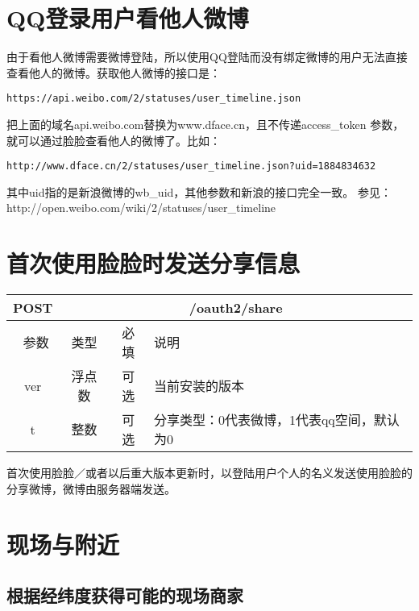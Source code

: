 \documentclass[cs4size]{ctexartutf8}
\begin{document}




\section{QQ登录用户看他人微博}
由于看他人微博需要微博登陆，所以使用QQ登陆而没有绑定微博的用户无法直接查看他人的微博。获取他人微博的接口是：
\begin{verbatim}
https://api.weibo.com/2/statuses/user_timeline.json
\end{verbatim}

把上面的域名api.weibo.com替换为www.dface.cn，且不传递access\_token 参数，就可以通过脸脸查看他人的微博了。比如：
\begin{verbatim}
http://www.dface.cn/2/statuses/user_timeline.json?uid=1884834632
\end{verbatim}
其中uid指的是新浪微博的wb\_uid，其他参数和新浪的接口完全一致。
参见：http://open.weibo.com/wiki/2/statuses/user\_timeline



\section{首次使用脸脸时发送分享信息}

\begin{table}[H]
   \begin{center}
\begin{tabular}{|c|c|c|p{12cm}|}
\hline
POST & \multicolumn{3}{|c|}{/oauth2/share} \\
\hline\hline
 \  参数  & 类型 & 必填 &  说明  \\
\hline
   ver  & 浮点数 & 可选 &  当前安装的版本\\
\hline
   t  & 整数 & 可选 &  分享类型：0代表微博，1代表qq空间，默认为0\\
\hline
\end{tabular}
   \end{center}
\end{table}

首次使用脸脸／或者以后重大版本更新时，以登陆用户个人的名义发送使用脸脸的分享微博，微博由服务器端发送。


\section{现场与附近}

\subsection{根据经纬度获得可能的现场商家}
\end{document}
